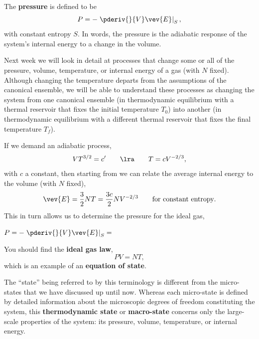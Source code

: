 \begin{shaded}
  The \textbf{pressure} is defined to be
  \begin{equation}
    \label{eq:pressure}
    P = -\left. \pderiv{}{V} \vev{E}\right|_S,
  \end{equation}
  with constant entropy $S$.
  In words, the pressure is the adiabatic response of the system's internal energy to a change in the volume.
\end{shaded}

Next week we will look in detail at processes that change some or all of the pressure, volume, temperature, or internal energy of a gas (with $N$ fixed).
Although changing the temperature departs from the assumptions of the canonical ensemble, we will be able to understand these processes as changing the system from one canonical ensemble (in thermodynamic equilibrium with a thermal reservoir that fixes the initial temperature $T_0$) into another (in thermodynamic equilibrium with a different thermal reservoir that fixes the final temperature $T_f$).

If we demand an adiabatic process,
\begin{equation*}
  V T^{3/2} = c' \qquad \lra \qquad T = c V^{-2 / 3},
\end{equation*}
with $c$ a constant, then starting from  we can relate the average internal energy to the volume (with $N$ fixed),
\begin{equation*}
  \vev{E} = \frac{3}{2} NT = \frac{3c}{2} N V^{-2 / 3} \qquad \mbox{for constant entropy}.
\end{equation*}
This in turn allows us to determine the pressure for the ideal gas,
\begin{mdframed}
  $\displaystyle P = -\left. \pderiv{}{V} \vev{E}\right|_S = $ \\[100 pt]
\end{mdframed}

\begin{shaded}
  You should find the \textbf{ideal gas law},
  \begin{equation}
    \label{eq:ideal_gas_law}
    PV = NT,
  \end{equation}
  which is an example of an \textbf{equation of state}.
\end{shaded}

The ``state'' being referred to by this terminology is different from the micro-states that we have discussed up until now.
Whereas each micro-state is defined by detailed information about the microscopic degrees of freedom constituting the system, this \textbf{thermodynamic state} or \textbf{macro-state} concerns only the large-scale properties of the system: its pressure, volume, temperature, or internal energy.

